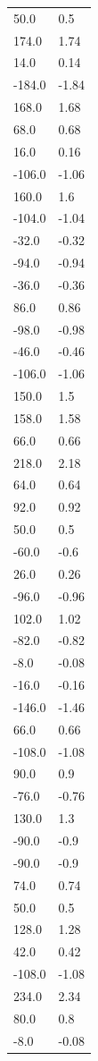 \begin{longtable}{ll}
50.0 & 0.5 \\
174.0 & 1.74 \\
14.0 & 0.14 \\
-184.0 & -1.84 \\
168.0 & 1.68 \\
68.0 & 0.68 \\
16.0 & 0.16 \\
-106.0 & -1.06 \\
160.0 & 1.6 \\
-104.0 & -1.04 \\
-32.0 & -0.32 \\
-94.0 & -0.94 \\
-36.0 & -0.36 \\
86.0 & 0.86 \\
-98.0 & -0.98 \\
-46.0 & -0.46 \\
-106.0 & -1.06 \\
150.0 & 1.5 \\
158.0 & 1.58 \\
66.0 & 0.66 \\
218.0 & 2.18 \\
64.0 & 0.64 \\
92.0 & 0.92 \\
50.0 & 0.5 \\
-60.0 & -0.6 \\
26.0 & 0.26 \\
-96.0 & -0.96 \\
102.0 & 1.02 \\
-82.0 & -0.82 \\
-8.0 & -0.08 \\
-16.0 & -0.16 \\
-146.0 & -1.46 \\
66.0 & 0.66 \\
-108.0 & -1.08 \\
90.0 & 0.9 \\
-76.0 & -0.76 \\
130.0 & 1.3 \\
-90.0 & -0.9 \\
-90.0 & -0.9 \\
74.0 & 0.74 \\
50.0 & 0.5 \\
128.0 & 1.28 \\
42.0 & 0.42 \\
-108.0 & -1.08 \\
234.0 & 2.34 \\
80.0 & 0.8 \\
-8.0 & -0.08 \\

\end{longtable}
